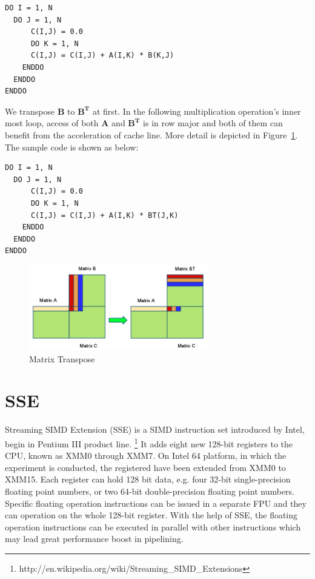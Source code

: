 \documentclass[12pt]{article}
\begin{document}
\begin{verbatim}
DO I = 1, N 
  DO J = 1, N
	  C(I,J) = 0.0 
      DO K = 1, N
      C(I,J) = C(I,J) + A(I,K) * B(K,J) 
    ENDDO
  ENDDO
ENDDO
\end{verbatim}

We transpose $\mathbf{B}$ to $\mathbf{B^{T}}$ at first. In the 
following multiplication operation's inner most loop, access of 
both $\mathbf{A}$ and $\mathbf{B^{T}}$ is in row major and both
of them can benefit from the acceleration of cache line. More 
detail is depicted in Figure~\ref{fig:cacheline}. The sample code 
is shown as below:

\begin{verbatim}
DO I = 1, N 
  DO J = 1, N
	  C(I,J) = 0.0 
      DO K = 1, N
      C(I,J) = C(I,J) + A(I,K) * BT(J,K) 
    ENDDO
  ENDDO
ENDDO
\end{verbatim}

\begin{figure}[h!]
	\begin{center}
		\includegraphics[width=0.7\textwidth]{cacheline.png}
		\caption{\label{fig:cacheline}Matrix Transpose}
	\end{center}
\end{figure}

\section{SSE}
Streaming SIMD Extension (SSE) is a SIMD instruction set 
introduced by Intel, begin in Pentium III product line. 
\footnote{http://en.wikipedia.org/wiki/Streaming\_SIMD\_Extensions}
It adds eight new 128-bit registers to the CPU, known as XMM0 
through XMM7. On Intel 64 platform, in which the experiment is 
conducted, the registered have been extended from XMM0 to XMM15.
Each register can hold 128 bit data, e.g. four 32-bit single-precision
floating point numbers, or two 64-bit double-precision floating point
numbers. Specific floating operation instructions can be issued in a
separate FPU and they can operation on the whole 128-bit register.
With the help of SSE, the floating operation instructions can be
executed in parallel with other instructions which may lead great 
performance boost in pipelining. 
\end{document}
